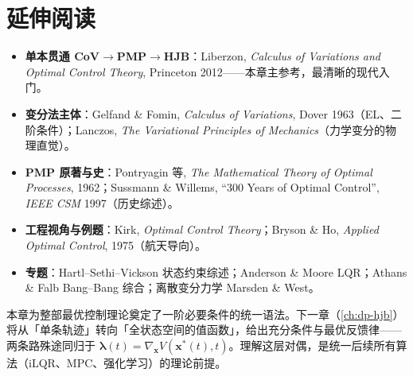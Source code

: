 \section*{延伸阅读}
\begin{itemize}
  \item \textbf{单本贯通 CoV$\to$PMP$\to$HJB}：Liberzon, \emph{Calculus of Variations and Optimal Control Theory}, Princeton 2012\cite{liberzon2012calculus}——本章主参考，最清晰的现代入门。
  \item \textbf{变分法主体}：Gelfand \& Fomin, \emph{Calculus of Variations}, Dover 1963\cite{gelfand1963calculus}（EL、二阶条件）；Lanczos, \emph{The Variational Principles of Mechanics}\cite{lanczos1970variational}（力学变分的物理直觉）。
  \item \textbf{PMP 原著与史}：Pontryagin 等, \emph{The Mathematical Theory of Optimal Processes}, 1962\cite{pontryagin1962mathematical}；Sussmann \& Willems, ``300 Years of Optimal Control'', \emph{IEEE CSM} 1997\cite{sussmann1997threehundred}（历史综述）。
  \item \textbf{工程视角与例题}：Kirk, \emph{Optimal Control Theory}\cite{kirk2004optimal}；Bryson \& Ho, \emph{Applied Optimal Control}, 1975\cite{bryson1975applied}（航天导向）。
  \item \textbf{专题}：Hartl--Sethi--Vickson 状态约束综述\cite{hartl1995survey}；Anderson \& Moore LQR\cite{anderson2007optimal}；Athans \& Falb Bang--Bang 综合\cite{athans1966optimal}；离散变分力学 Marsden \& West\cite{marsden2001discrete}。
\end{itemize}

本章为整部最优控制理论奠定了一阶必要条件的统一语法。下一章（\cref{ch:dp-hjb}）将从「单条轨迹」转向「全状态空间的值函数」，给出充分条件与最优反馈律——两条路殊途同归于 $\boldsymbol\lambda(t)=\nabla_{\mathbf x}V(\mathbf x^\ast(t),t)$。理解这层对偶，是统一后续所有算法（iLQR、MPC、强化学习）的理论前提。

